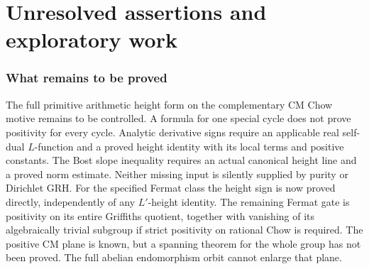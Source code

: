 \documentclass[11pt,a4paper]{article}
\begin{document}
\part{Unresolved assertions and exploratory work}
\section{What remains to be proved}
The full primitive arithmetic height form on the complementary CM Chow
motive remains to be controlled. A formula for one special cycle does
not prove positivity for every cycle. Analytic derivative signs require
an applicable real self-dual $L$-function and a proved height identity
with its local terms and positive constants. The Bost slope inequality
requires an actual canonical height line and a proved norm estimate.
Neither missing input is silently supplied by purity or Dirichlet GRH.
For the specified Fermat class the height sign is now proved directly,
independently of any $L'$-height identity. The remaining Fermat gate is
positivity on its entire Griffiths quotient, together with vanishing
of its algebraically trivial subgroup if strict positivity on rational
Chow is required. The positive CM plane is known, but a spanning
theorem for the whole group has not been proved. The full abelian
endomorphism orbit cannot enlarge that plane.
\end{document}
